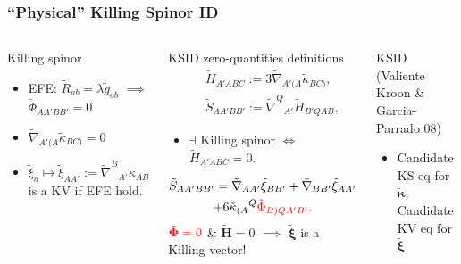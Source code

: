\documentclass[10pt]{beamer}
\theoremstyle{plain}
\def\bmg{{\bm g}}
\def\bmH{{\bm H}}
\begin{document}
\begin{frame}
\frametitle{ ``Physical'' Killing Spinor ID}
\begin{columns}
\column{7.3cm}
\vspace{-5mm}
\begin{block}{Killing spinor}
  \begin{itemize}
  \item EFE: $\tilde{R}_{ab}=\lambda\tilde{g}_{ab}$ $\implies$ $\tilde{\Phi}_{AA'BB'}=0$
  \item $ \tilde{\nabla}_{A'(A}\tilde{\kappa}_{BC)}=0$
  \item $\tilde{\xi}_{a} \mapsto \tilde{\xi}_{AA'}:= \tilde{\nabla}^{B}{}_{A'}\tilde{\kappa}_{AB}$
    is a KV if EFE hold.
  \end{itemize}
\end{block}
\pause
\begin{exampleblock}{KSID zero-quantities definitions}
\vspace{-5mm}
\begin{subequations}
\begin{eqnarray*}
&& \tilde{H}_{A'ABC} := 3
  \tilde{\nabla}_{A'(A}\tilde{\kappa}_{BC)}, \label{DefZeroQuantityH}\\ && \tilde{S}_{AA'BB'}
  :=
  \tilde{\nabla}^{Q}{}_{A'}\tilde{H}_{B'Q AB}, \label{DefZeroQuantityS}
\end{eqnarray*}
\end{subequations}
\vspace{-6mm}
\begin{itemize}
\item $\exists$ Killing spinor %
  $\iff$
  $\tilde{H}_{A'ABC}=0$.
\end{itemize}
\pause
\begin{multline*}\tilde{S}_{AA'BB'} = \tilde{\nabla}_{AA'}\tilde{\xi}_{BB'} +
  \tilde{\nabla}_{BB'}\tilde{\xi}_{AA'} \\ + 6\tilde{\kappa}_{(A}{}^{Q}\color{red}{\tilde{\Phi}}_{B)QA'B'}.
\end{multline*}
$\color{red}{\tilde{\bm\Phi}=0}$ \& $\tilde{\bmH}=0$ $\implies$ $\tilde{\bm\xi}$ is a Killing vector!
\end{exampleblock}
\column{4.3cm}
\vspace{-10mm}
\pause
\begin{block}{KSID (Valiente Kroon \& Garcia-Parrado 08) }
  \begin{itemize}
  \item Candidate KS eq for $\tilde{\bm\kappa}$, Candidate KV eq for $\tilde{\bm\xi}$.

\end{itemize}
\end{block}
\end{columns}
\end{frame}
\end{document}
